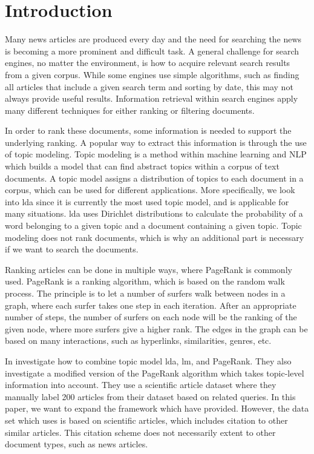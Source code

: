 \section{Introduction} 


Many news articles are produced every day and the need for searching the news is becoming a more prominent and difficult task.
A general challenge for search engines, no matter the environment, is how to acquire relevant search results from a given corpus. 
While some engines use simple algorithms, such as finding all articles that include a given search term and sorting by date, this may not always provide useful results.
Information retrieval within search engines apply many different techniques for either ranking or filtering documents\cite{google_pagerank2006}.

In order to rank these documents, some information is needed to support the underlying ranking.
A popular way to extract this information is through the use of topic modeling.
Topic modeling is a method within machine learning and \gls{NLP} which builds a model that can find abstract topics within a corpus of text documents.
A topic model assigns a distribution of topics to each document in a corpus, which can be used for different applications.
More specifically, we look into \gls{lda} since it is currently the most used topic model, and is applicable for many situations\cite{lda}.
\gls{lda} uses Dirichlet distributions to calculate the probability of a word belonging to a given topic and a document containing a given topic.
Topic modeling does not rank documents, which is why an additional part is necessary if we want to search the documents.

Ranking articles can be done in multiple ways, where PageRank is commonly used\cite{google_pagerank2006}.
PageRank\cite{pagerank_1999} is a ranking algorithm, which is based on the random walk process.
The principle is to let a number of surfers walk between nodes in a graph, where each surfer takes one step in each iteration.
After an appropriate number of steps, the number of surfers on each node will be the ranking of the given node, where more surfers give a higher rank.
The edges in the graph can be based on many interactions, such as hyperlinks, similarities, genres, etc.

In \cite{yang2009topic} \citeauthor{yang2009topic} investigate how to combine topic model \gls{lda}, \gls{lm}, and PageRank.
They also investigate a modified version of the PageRank algorithm which takes topic-level information into account.
They use a scientific article dataset where they manually label 200 articles from their dataset based on related queries. 
In this paper, we want to expand the framework which \cite{yang2009topic} have provided.
However, the data set which \cite{yang2009topic} uses is based on scientific articles, which includes citation to other similar articles.
This citation scheme does not necessarily extent to other document types, such as news articles.

